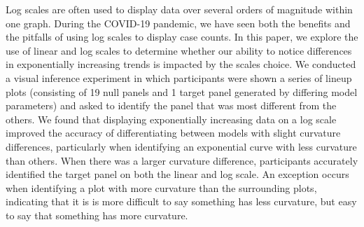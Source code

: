   Log scales are often used to display data over several orders of magnitude within one graph. During the COVID-19 pandemic, we have seen both the benefits and the pitfalls of using log scales to display case counts. In this paper, we explore the use of linear and log scales to determine whether our ability to notice differences in exponentially increasing trends is impacted by the scales choice. We conducted a visual inference experiment in which participants were shown a series of lineup plots (consisting of 19 null panels and 1 target panel generated by differing model parameters) and asked to identify the panel that was most different from the others. We found that displaying exponentially increasing data on a log scale improved the accuracy of differentiating between models with slight curvature differences, particularly when identifying an exponential curve with less curvature than others. When there was a larger curvature difference, participants accurately identified the target panel on both the linear and log scale. An exception occurs when identifying a plot with more curvature than the surrounding plots, indicating that it is is more difficult to say something has less curvature, but easy to say that something has more curvature.